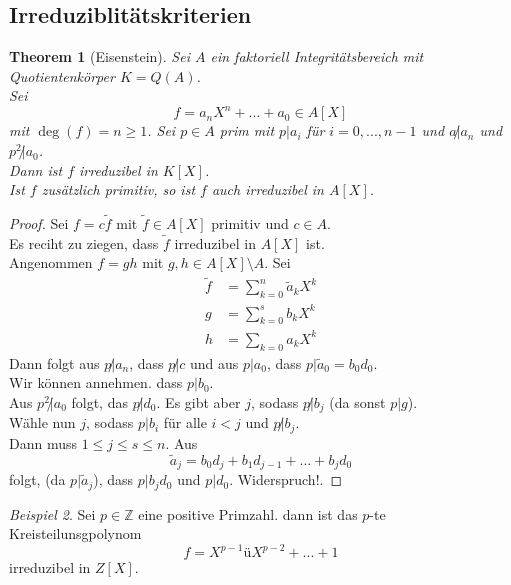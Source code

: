\documentclass[10pt,a4paper]{article}
\newcommand{\Z}{\ensuremath{\mathbb{Z}}}
\theoremstyle{plain}
\newtheorem{theorem}{Theorem}[section]
\theoremstyle{definition}
\theoremstyle{remark}
\newtheorem{exm}[theorem]{Beispiel}
\begin{document}
	\subsection{Irreduziblitätskriterien}
	\begin{theorem}[Eisenstein]
		Sei $A$ ein faktoriell Integritätsbereich mit Quotientenkörper $K=Q(A)$.\\
		Sei
		\[f=a_nX^n+...+a_0\in A[X]\]
		mit $\deg(f)=n\geq 1$. Sei $p\in A$ prim mit $p|a_i$ für $i=0,...,n-1$ und $a\not|a_n$ und $p^2\not |a_0$.\\
		Dann ist $f$ irreduzibel in $K[X]$.\\
		Ist $f$ zusätzlich primitiv, so ist $f$ auch irreduzibel in $A[X]$.
	\end{theorem}
	\begin{proof}
		Sei $f=c\tilde f$ mit $\tilde f\in A[X]$ primitiv und $c\in A$.\\
		Es reciht zu ziegen, dass $\tilde f$ irreduzibel in $A[X]$ ist.\\
		Angenommen $f=gh$ mit $g,h\in A[X]\setminus A$. Sei
		\begin{align*}
		\tilde f&=\sum_{k=0}^{n}\tilde a_kX^k\\
		g&=\sum_{k=0}^{s}b_kX^k\\
		h&=\sum_{k=0} a_kX^k
		\end{align*}
		Dann folgt aus $p\not|a_n$, dass $p\not|c$ und aus $p|a_0$, dass $p|\tilde a_0=b_0d_0$.\\
		Wir können annehmen. dass $p|b_0$.\\
		Aus $p^2\not |a_0$ folgt, das $p\not| d_0$. Es gibt aber $j$, sodass $p\not|b_j$ (da sonst $p|g$).\\
		Wähle nun $j$, sodass $p|b_i$ für alle $i<j$ und $p\not| b_j$.\\
		Dann muss $1\leq j\leq s\leq n$. Aus 
		\[\tilde a_j=b_0d_j+b_1d_{j-1}+...+b_jd_0\]
		folgt, (da $p|\tilde a_j$), dass $p|b_jd_0$ und $p|d_0$. Widerspruch!.
	\end{proof}

	\begin{exm}
		Sei $p\in\Z$ eine positive Primzahl. dann ist das $p$-te Kreisteilunsgpolynom
		\[f=X^{p-1}üX^{p-2}+...+1\]
		irreduzibel in $Z[X]$.
	\end{exm}
\end{document}
